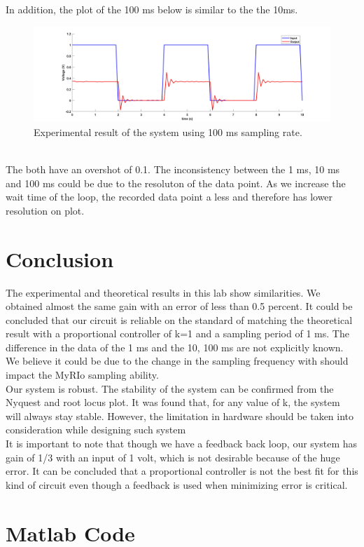 \documentclass[12pt,letterpaper]{article}
\begin{document}
In addition, the plot of the 100 ms below is similar to the the 10ms.\\
\begin{figure}[h]
    \centering
    \includegraphics[width=15cm]{expstepin100.jpg}
    \caption{Experimental result of the system using 100 ms sampling rate.}
\end{figure}\\
The both have an overshot of 0.1. The inconsistency between the 1 ms, 10 ms and 100 ms 
could be due to the resoluton of the data point. As we increase the wait time of the loop,
the recorded data point a less and therefore has lower resolution on plot.
\section*{Conclusion}
The experimental and theoretical results in this lab show similarities. We obtained
almost the same gain with an error of less than 0.5 percent. It could be  concluded that 
our circuit is reliable on the standard of matching the theoretical result with a proportional 
controller of k=1 and a sampling period of 1 ms. The difference in the data 
of the 1 ms and the 10, 100 ms are not explicitly known. We believe it could
be due to the change in the sampling frequency with should impact
the MyRIo sampling ability. \\
Our system is robust. The stability of the system can be confirmed from the Nyquest and root locus
plot.  It was found that, for any value of k, the system will always stay 
stable. However, the limitation in hardware should be taken 
into consideration while designing such system\\
It is important to note that though we have a feedback back loop, our system has gain of  1/3
with an input of 1 volt, which is not desirable because of the huge error. It can be concluded that 
a proportional controller is not the best fit for this kind of circuit 
even though a feedback is used when minimizing error is critical.
\appendix
{}


\section*{Matlab Code}


\end{document}
